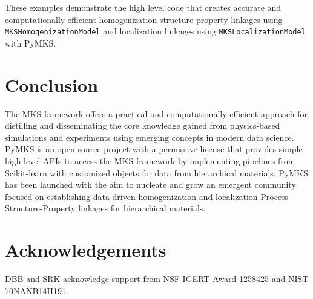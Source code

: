 \documentclass{bmcart}
\begin{document}
    These examples demonstrate the high level code that creates accurate and computationally efficient homogenization structure-property linkages using \texttt{MKSHomogenizationModel} and localization linkages using \texttt{MKSLocalizationModel} with PyMKS. 

\section{Conclusion}

The MKS framework offers a practical and computationally efficient approach for distilling and disseminating the core knowledge gained from physics-based simulations and experiments using emerging concepts in modern data science. PyMKS is an open source project with a permissive license that provides simple high level APIs to access the MKS framework by implementing pipelines from Scikit-learn with customized objects for data from hierarchical materials. PyMKS has been launched with the aim to nucleate and grow an emergent community focused on establishing data-driven homogenization and localization Process-Structure-Property linkages for hierarchical materials.





\section*{Acknowledgements}

DBB and SRK acknowledge support from NSF-IGERT Award 1258425 and NIST 70NANB14H191. 
\end{document}
